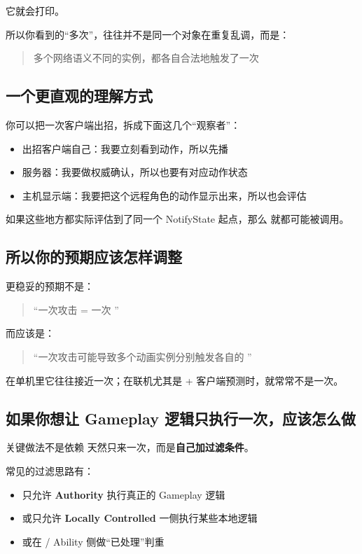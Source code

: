 它就会打印。

所以你看到的“多次”，往往并不是同一个对象在重复乱调，而是：

\begin{quote}
	多个网络语义不同的实例，都各自合法地触发了一次
\end{quote}

\subsection{一个更直观的理解方式}

你可以把一次客户端出招，拆成下面这几个“观察者”：

\begin{itemize}
	\item 出招客户端自己：我要立刻看到动作，所以先播
	\item 服务器：我要做权威确认，所以也要有对应动作状态
	\item 主机显示端：我要把这个远程角色的动作显示出来，所以也会评估
\end{itemize}

如果这些地方都实际评估到了同一个 NotifyState 起点，那么  就都可能被调用。

\subsection{所以你的预期应该怎样调整}

更稳妥的预期不是：

\begin{quote}
	“一次攻击 = 一次 ”
\end{quote}

而应该是：

\begin{quote}
	“一次攻击可能导致多个动画实例分别触发各自的 ”
\end{quote}

在单机里它往往接近一次；在联机尤其是  + 客户端预测时，就常常不是一次。

\subsection{如果你想让 Gameplay 逻辑只执行一次，应该怎么做}

关键做法不是依赖  天然只来一次，而是\textbf{自己加过滤条件}。

常见的过滤思路有：

\begin{itemize}
	\item 只允许 \textbf{Authority} 执行真正的 Gameplay 逻辑
	\item 或只允许 \textbf{Locally Controlled} 一侧执行某些本地逻辑
	\item 或在  / Ability 侧做“已处理”判重
\end{itemize}

